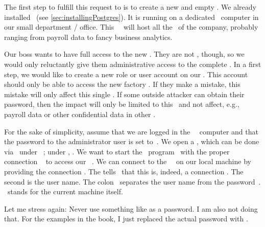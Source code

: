 %
%
%
%
%
The first step to fulfill this request to is to create a new and empty \db.
We already installed \postgresql\ (see \cref{sec:installingPostgres}).
It is running on a dedicated \server\ computer in our small  department / office.
This \db\ \server\ will host all the \dbs\ of the company, probably ranging from payroll data to fancy business analytics.

Our boss wants to have full access to the new \db.
They are not , though, so we would only reluctantly give them administrative access to the complete \server.
In a first step, we would like to create a new role or user account on our \dbms.
This account should only be able to access the new factory \db.
If they make a mistake, this mistake will only affect this single \db.
If some outside attacker can obtain their password, then the impact will only be limited to this \db\ and not affect, e.g., payroll data or other confidential data in other \dbs.

For the sake of simplicity, assume that we are logged in the \db~\server\ computer and that the password to the administrator user  is set to~.
We open a , which can be done via \ubuntuTerminal\ under \ubuntu\ \linux; under \microsoftWindows, \windowsTerminal.
We want to start the \client\ program \psql\ with the proper connection ~\cite{PGDG:PD} to access our \postgresql\ \server.%
%
%
%
We can connect to the \postgresql\ \server\ on our local machine by providing the connection  .
The  tells \psql\ that this is, indeed, a connection .
The second  is the user name.
The colon~\inQuotes{\textil{:}} separates the user name from the password~.
\localhost\ stands for the current machine itself.

Let me stress again:
Never use something like  as a password.
I am also not doing that.
For the examples in the book, I just replaced the actual password with .

